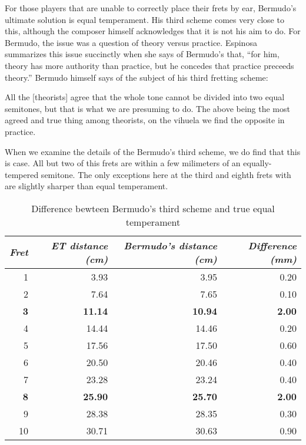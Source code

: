 For those players that are unable to correctly place their frets by ear, Bermudo's ultimate
solution is equal temperament.  His third scheme comes very close to this, although the composer
himself acknowledges that it is not his aim to do.  For Bermudo,
the issue was a question of theory versus practice.  Espinosa summarizes this issue succinctly
when she says of Bermudo's that, ``for him, theory has more authority than practice, but he
concedes that practice preceeds theory.'' \autocite[xx]{DE:1}  Bermudo himself says of the subject of his third
fretting scheme:

\begin{blocks}
All the [theorists] agree that the whole tone cannot be divided into two equal semitones, but
that is what we are presuming to do.  The above being the most agreed and true thing among
theorists, on the vihuela we find the opposite in practice. \autocite[xx]{DE:1}
\end{blocks}

When we examine the details of the Bermudo's third scheme, we do find that this is case. All
but two of this frets are within a few milimeters of an equally-tempered semitone. The only
exceptions here at the third and eighth frets with are slightly sharper than equal temperament.

\begin{table}[h!]
    \begin{center}
    \begin{tabular}{ r r r r }
      \textit{Fret} & \textit{ET distance (cm)} & \textit{Bermudo's distance (cm)} & \textit{Difference (mm)} \\
      \hline
      1  & 3.93	  & 3.95	& 0.20 \\
      2  & 7.64	  & 7.65	& 0.10 \\
      \textbf{3}  & \textbf{11.14}	& \textbf{10.94}	& \textbf{2.00} \\
      4  & 14.44	& 14.46	& 0.20 \\
      5  & 17.56	& 17.50	& 0.60 \\
      6  & 20.50	& 20.46	& 0.40 \\
      7  & 23.28	& 23.24	& 0.40 \\
      \textbf{8}  & \textbf{25.90}	& \textbf{25.70}	& \textbf{2.00} \\
      9  & 28.38	& 28.35	& 0.30 \\
      10 & 30.71	& 30.63	& 0.90 \\
    \end{tabular}
    \end{center}
    \caption{Difference bewteen Bermudo's third scheme and true equal temperament}
\end{table}

